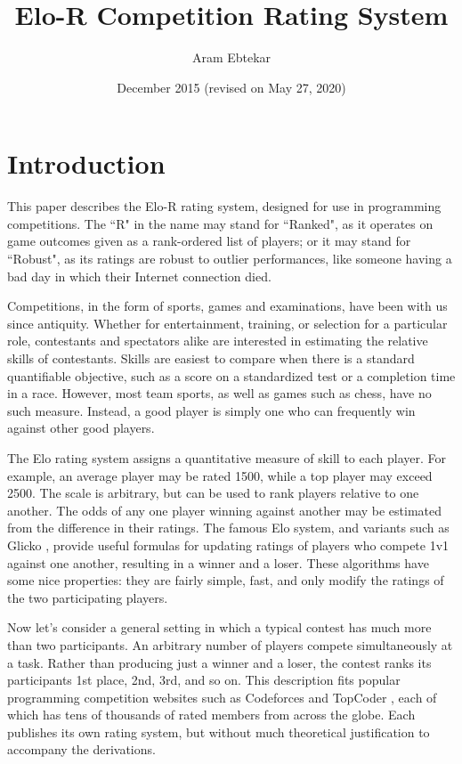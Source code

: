 \documentclass{article}
\title{Elo-R Competition Rating System}
\author{Aram Ebtekar}
\date{December 2015 (revised on May 27, 2020)}
\begin{document}
\maketitle

\section{Introduction}

This paper describes the Elo-R rating system, designed for use in programming competitions. The ``R" in the name may stand for ``Ranked", as it operates on game outcomes given as a rank-ordered list of players; or it may stand for ``Robust", as its ratings are robust to outlier performances, like someone having a bad day in which their Internet connection died.

Competitions, in the form of sports, games and examinations, have been with us since antiquity. Whether for entertainment, training, or selection for a particular role, contestants and spectators alike are interested in estimating the relative skills of contestants. Skills are easiest to compare when there is a standard quantifiable objective, such as a score on a standardized test or a completion time in a race.  However, most team sports, as well as games such as chess, have no such measure. Instead, a good player is simply one who can frequently win against other good players.

The Elo rating system assigns a quantitative measure of skill to each player. For example, an average player may be rated 1500, while a top player may exceed 2500. The scale is arbitrary, but can be used to rank players relative to one another. The odds of any one player winning against another may be estimated from the difference in their ratings. The famous Elo system, and variants such as Glicko \cite{glicko}, provide useful formulas for updating ratings of players who compete 1v1 against one another, resulting in a winner and a loser. These algorithms have some nice properties: they are fairly simple, fast, and only modify the ratings of the two participating players.

Now let's consider a general setting in which a typical contest has much more than two participants. An arbitrary number of players compete simultaneously at a task. Rather than producing just a winner and a loser, the contest ranks its participants 1st place, 2nd, 3rd, and so on. This description fits popular programming competition websites such as Codeforces \cite{Codeforces} and TopCoder \cite{TopCoder}, each of which has tens of thousands of rated members from across the globe. Each publishes its own rating system, but without much theoretical justification to accompany the derivations.
\end{document}
